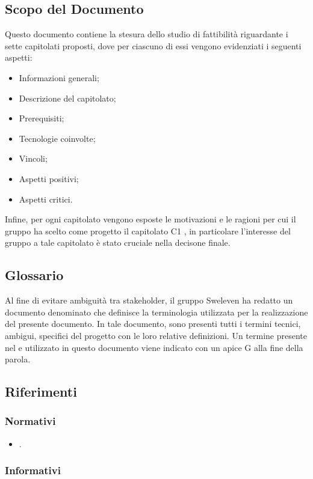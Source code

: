 \subsection{Scopo del Documento}
Questo documento contiene la stesura dello studio di fattibilità riguardante i sette capitolati proposti, dove per ciascuno di essi vengono evidenziati i seguenti aspetti:
\begin{itemize}
    \item Informazioni generali;
    \item Descrizione del capitolato;
    \item Prerequisiti;
    \item Tecnologie coinvolte;
    \item Vincoli;
    \item Aspetti positivi;
    \item Aspetti critici.
\end{itemize}
Infine, per ogni capitolato vengono esposte le motivazioni e le ragioni per cui il gruppo ha scelto come progetto il capitolato C1 \NomeProgetto{}, in particolare l’interesse del gruppo a tale capitolato è stato cruciale nella decisone finale.
\subsection{Glossario}
Al fine di evitare ambiguità tra stakeholder, il gruppo Sweleven ha redatto un documento denominato \Glossariov{} che definisce la terminologia utilizzata per la realizzazione del presente documento.
In tale documento, sono presenti tutti i termini tecnici, ambigui, specifici del progetto con le loro relative definizioni.
Un termine presente nel \Glossariov e utilizzato in questo documento viene indicato con un apice G alla fine della parola.
\subsection{Riferimenti}

\subsubsection{Normativi}
\begin{itemize}
\item \NdPv {}.
\end{itemize}

\subsubsection{Informativi}

